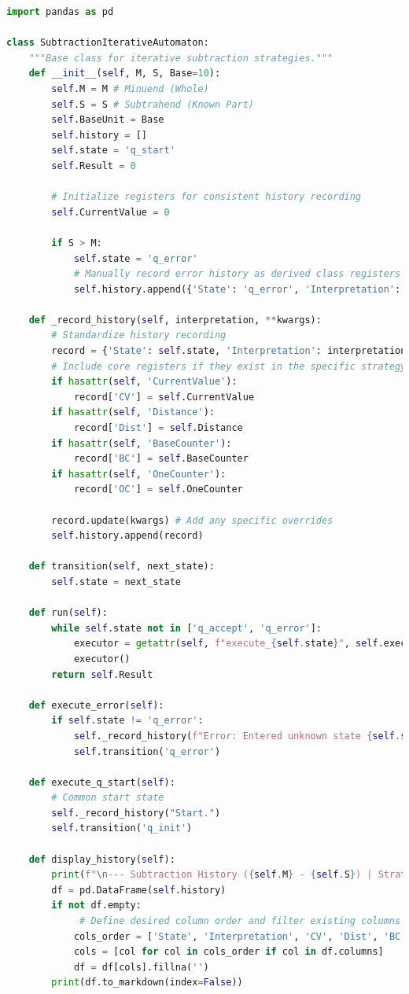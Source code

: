 \documentclass[11pt]{article}
\begin{document}
\begin{lstlisting}[language=Python]
import pandas as pd

class SubtractionIterativeAutomaton:
    """Base class for iterative subtraction strategies."""
    def __init__(self, M, S, Base=10):
        self.M = M # Minuend (Whole)
        self.S = S # Subtrahend (Known Part)
        self.BaseUnit = Base
        self.history = []
        self.state = 'q_start'
        self.Result = 0

        # Initialize registers for consistent history recording
        self.CurrentValue = 0

        if S > M:
            self.state = 'q_error'
            # Manually record error history as derived class registers may not be initialized yet
            self.history.append({'State': 'q_error', 'Interpretation': f"Error: Subtrahend ({S}) > Minuend ({M})."})

    def _record_history(self, interpretation, **kwargs):
        # Standardize history recording
        record = {'State': self.state, 'Interpretation': interpretation}
        # Include core registers if they exist in the specific strategy
        if hasattr(self, 'CurrentValue'):
            record['CV'] = self.CurrentValue
        if hasattr(self, 'Distance'):
            record['Dist'] = self.Distance
        if hasattr(self, 'BaseCounter'):
            record['BC'] = self.BaseCounter
        if hasattr(self, 'OneCounter'):
            record['OC'] = self.OneCounter

        record.update(kwargs) # Add any specific overrides
        self.history.append(record)

    def transition(self, next_state):
        self.state = next_state

    def run(self):
        while self.state not in ['q_accept', 'q_error']:
            executor = getattr(self, f"execute_{self.state}", self.execute_error)
            executor()
        return self.Result

    def execute_error(self):
        if self.state != 'q_error':
            self._record_history(f"Error: Entered unknown state {self.state}")
            self.transition('q_error')

    def execute_q_start(self):
        # Common start state
        self._record_history("Start.")
        self.transition('q_init')

    def display_history(self):
        print(f"\n--- Subtraction History ({self.M} - {self.S}) | Strategy: {self.strategy_name} ---")
        df = pd.DataFrame(self.history)
        if not df.empty:
             # Define desired column order and filter existing columns
            cols_order = ['State', 'Interpretation', 'CV', 'Dist', 'BC', 'OC']
            cols = [col for col in cols_order if col in df.columns]
            df = df[cols].fillna('')
        print(df.to_markdown(index=False))


\end{lstlisting}
\end{document}
